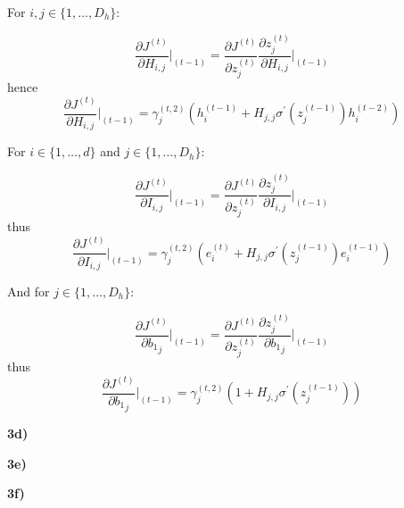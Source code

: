 \documentclass{article}
\begin{document}
For $i,j \in \{1, \dots, D_{h}\}$:


\begin{equation}\label{eq:46}
\frac{\partial J^{(t)}}{\partial H_{i,j}}\vert_{(t-1)} =\frac{\partial J^{(t)}}{\partial z^{(t)}_{j}}\frac{\partial  z^{(t)}_{j}}{\partial H_{i,j}}\vert_{(t-1)}  
\end{equation}
hence
\begin{equation}\label{eq:47}
\frac{\partial J^{(t)}}{\partial H_{i,j}}\vert_{(t-1)} =  \gamma^{(t,2)}_{j}(h^{(t-1)}_{i} + H_{j,j}\sigma^{\prime}(z^{(t-1)}_{j})h^{(t-2)}_{i})
\end{equation}



For $i \in \{1, \dots, d\}$ and $j \in \{1, \dots, D_{h}\}$:

\begin{equation}\label{eq:48}
\frac{\partial J^{(t)}}{\partial I_{i,j}}\vert_{(t-1)} =\frac{\partial J^{(t)}}{\partial z^{(t)}_{j}}\frac{\partial  z^{(t)}_{j}}{\partial I_{i,j}}\vert_{(t-1)}  
\end{equation}
thus
\begin{equation}\label{eq:49}
\frac{\partial J^{(t)}}{\partial I_{i,j}}\vert_{(t-1)} = \gamma^{(t,2)}_{j}(e^{(t)}_{i} + H_{j,j}\sigma^{\prime}(z^{(t-1)}_{j})e^{(t-1)}_{i})
\end{equation}

And for $j \in \{1, \dots, D_{h}\}$:

\begin{equation}\label{eq:50}
\frac{\partial J^{(t)}}{\partial {b_1}_{j}}\vert_{(t-1)} =\frac{\partial J^{(t)}}{\partial z^{(t)}_{j}}\frac{\partial  z^{(t)}_{j}}{\partial {b_1}_{j}}\vert_{(t-1)}  
\end{equation}
thus
\begin{equation}\label{eq:51}
\frac{\partial J^{(t)}}{\partial {b_1}_{j}}\vert_{(t-1)} = \gamma^{(t,2)}_{j}(1 + H_{j,j}\sigma^{\prime}(z^{(t-1)}_{j}))
\end{equation}

\textbf{3d)}

\textbf{3e)}

\textbf{3f)}
\end{document}
